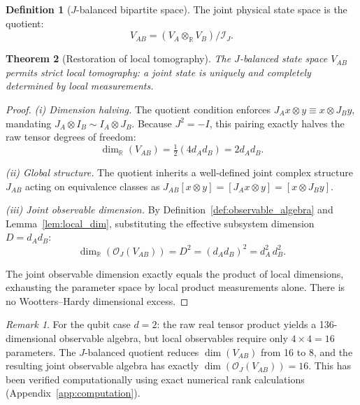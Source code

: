 \documentclass[aps,prd,twocolumn,superscriptaddress,nofootinbib]{revtex4-2}
\newtheorem{theorem}{Theorem}[section]
\theoremstyle{definition}
\newtheorem{definition}[theorem]{Definition}
\theoremstyle{remark}
\newtheorem*{remark}{Remark}
\newcommand{\R}{\mathbb{R}}
\newcommand{\OJ}{\mathcal{O}_J}
\newcommand{\IdealJ}{\mathcal{I}_J}
\begin{document}
\begin{definition}[$J$-balanced bipartite space]
\label{def:balanced_space}
The joint physical state space is the quotient:
\begin{equation}
V_{AB} = (V_A \otimes_\R V_B) / \IdealJ.
\label{eq:quotient}
\end{equation}
\end{definition}

\begin{theorem}[Restoration of local tomography]
\label{thm:local_tomography}
The $J$-balanced state space $V_{AB}$ permits strict local tomography: a
joint state is uniquely and completely determined by local measurements.
\end{theorem}

\begin{proof}
\textit{(i) Dimension halving.} The quotient condition enforces
$J_A x \otimes y \equiv x \otimes J_B y$, mandating
$J_A \otimes I_B \sim I_A \otimes J_B$. Because $J^2 = -I$, this pairing
exactly halves the raw tensor degrees of freedom:
\begin{equation}
\dim_\R(V_{AB}) = \tfrac{1}{2}(4 d_A d_B) = 2 d_A d_B.
\end{equation}

\textit{(ii) Global structure.} The quotient inherits a well-defined joint
complex structure $J_{AB}$ acting on equivalence classes as
$J_{AB}[x \otimes y] = [J_A x \otimes y] = [x \otimes J_B y]$.

\textit{(iii) Joint observable dimension.} By
Definition~\ref{def:observable_algebra} and Lemma~\ref{lem:local_dim},
substituting the effective subsystem dimension $D = d_A d_B$:
\begin{equation}
\dim_\R(\OJ(V_{AB})) = D^2 = (d_A d_B)^2 = d_A^2 \, d_B^2.
\end{equation}

The joint observable dimension exactly equals the product of local
dimensions, exhausting the parameter space by local product measurements
alone. There is no Wootters--Hardy dimensional excess.
\end{proof}

\begin{remark}
For the qubit case $d = 2$: the raw real tensor product yields a
136-dimensional observable algebra, but local observables require only
$4 \times 4 = 16$ parameters. The $J$-balanced quotient reduces
$\dim(V_{AB})$ from 16 to 8, and the resulting joint observable algebra has
exactly $\dim(\OJ(V_{AB})) = 16$. This has been verified computationally
using exact numerical rank calculations (Appendix~\ref{app:computation}).
\end{remark}
\end{document}
